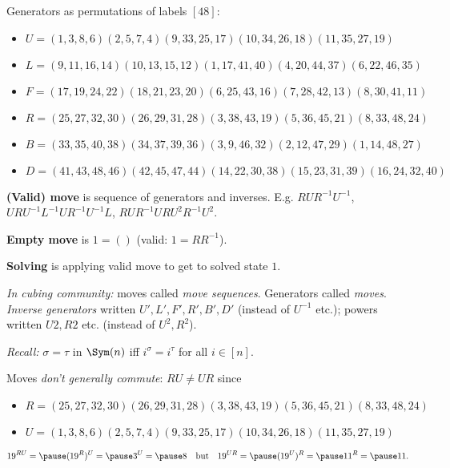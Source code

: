 \begin{slide}
    Generators as permutations of labels $[48]$:

    {\scriptsize
    \begin{itemize}
        \item $U = ( 1, 3, 8, 6)( 2, 5, 7, 4)( 9,33,25,17)(10,34,26,18)(11,35,27,19)$
        \item $L = ( 9,11,16,14)(10,13,15,12)( 1,17,41,40)( 4,20,44,37)( 6,22,46,35)$
        \item $F = (17,19,24,22)(18,21,23,20)( 6,25,43,16)( 7,28,42,13)( 8,30,41,11)$
        \item $R = (25,27,32,30)(26,29,31,28)( 3,38,43,19)( 5,36,45,21)( 8,33,48,24)$
        \item $B = (33,35,40,38)(34,37,39,36)( 3, 9,46,32)( 2,12,47,29)( 1,14,48,27)$
        \item $D = (41,43,48,46)(42,45,47,44)(14,22,30,38)(15,23,31,39)(16,24,32,40)$
    \end{itemize}} \pause

    \textbf{(Valid) move} is sequence of generators and inverses. E.g. $RUR^{-1}U^{-1}$, \pause $URU^{-1}L^{-1}UR^{-1}U^{-1}L$, \pause $RUR^{-1}URU^2R^{-1}U^2$.

    \textbf{Empty move} is $1 = ()$ (valid: $1 = RR^{-1}$). \pause

    \textbf{Solving} is applying valid move to get to solved state $1$.
\end{slide}

\begin{slide}
    \textit{In cubing community:} moves called \textit{move sequences}. Generators called \textit{moves}. \textit{Inverse generators} written $U',L',F',R',B',D'$ (instead of $U^{-1}$ etc.); powers written $U2,R2$ etc. (instead of $U^2,R^2$). \pause

    \textit{Recall:} $\sigma = \tau$ in $\Sym(n)$ iff $i^\sigma = i^\tau$ for all $i \in [n]$. \pause

    Moves \textit{don't generally commute}: $RU \neq UR$ since

        {\scriptsize
            \begin{itemize}
                \item $R = (25,27,32,30)(26,29,31,28)( 3,38,43,19)( 5,36,45,21)( 8,33,48,24)$
                \item $U = ( 1, 3, 8, 6)( 2, 5, 7, 4)( 9,33,25,17)(10,34,26,18)(11,35,27,19)$
            \end{itemize}}

    $$19^{RU} = \pause (19^R)^U = \pause 3^U = \pause 8 \quad\text{but}\quad 19^{UR} = \pause (19^U)^R = \pause 11^R = \pause 11.$$
\end{slide}

